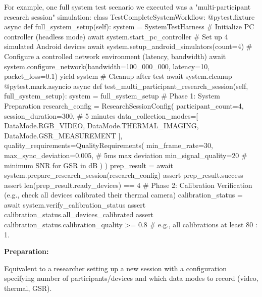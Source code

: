 {{{For example, one full system test scenario we executed was a "multi-participant research session" simulation: class TestCompleteSystemWorkflow: @pytest.fixture async def full_system_setup(self): system = SystemTestHarness # Initialize PC controller (headless mode) await system.start_pc_controller # Set up 4 simulated Android devices await system.setup_android_simulators(count=4) # Configure a controlled network environment (latency, bandwidth) await system.configure_network(bandwidth=100_000_000, latency=10, packet_loss=0.1) yield system # Cleanup after test await system.cleanup @pytest.mark.asyncio async def test_multi_participant_research_session(self, full_system_setup): system = full_system_setup # Phase 1: System Preparation research_config = ResearchSessionConfig( participant_count=4, session_duration=300, # 5 minutes data_collection_modes=[ DataMode.RGB_VIDEO, DataMode.THERMAL_IMAGING, DataMode.GSR_MEASUREMENT ], quality_requirements=QualityRequirements( min_frame_rate=30, max_sync_deviation=0.005, # 5ms max deviation min_signal_quality=20 # minimum SNR for GSR in dB ) ) prep_result = await system.prepare_research_session(research_config) assert prep_result.success assert len(prep_result.ready_devices) == 4 # Phase 2: Calibration Verification (e.g., check all devices calibrated their thermal camera) calibration_status = await system.verify_calibration_status assert calibration_status.all_devices_calibrated assert calibration_status.calibration_quality >= 0.8 # e.g., all calibrations at least 80%
: 1.

\textbf{Preparation:}

Equivalent to a researcher setting up a new session with a configuration specifying number of participants/devices and which data modes to record (video, thermal, GSR).

}}}
